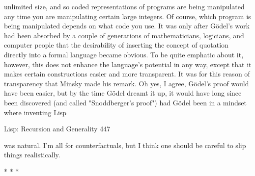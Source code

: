 unlimited size, and so coded representations of programs are being manipulated any
time you are manipulating certain large integers. Of course, which program is being
manipulated depends on what code you use. It was only after Gödel’s work had been
absorbed by a couple of generations of mathematicians, logicians, and computer
people that the desirability of inserting the concept of quotation directly into a formal
language became obvious. To be quite emphatic about it, however, this does not
enhance the language's potential in any way, except that it makes certain constructions
easier and more transparent. It was for this reason of transparency that Minsky made
his remark.
        Oh yes, I agree, Gödel’s proof would have been easier, but by the time Gödel
dreamt it up, it would have long since been discovered (and called "Snoddberger's
proof") had Gödel been in a mindset where inventing Lisp




Lisp: Recursion and Generality                                                       447

was natural. I'm all for counterfactuals, but I think one should be careful to slip things
realistically.

                                        *   *   *

